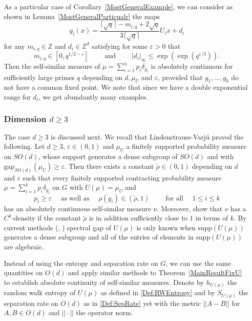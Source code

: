 \documentclass[10pt, english,oneside,reqno]{amsart}
\theoremstyle{plain}
\theoremstyle{remark}
\numberwithin{equation}{section}
\numberwithin{figure}{section}
\newcommand{\eps}{\varepsilon}
\newcommand{\Z}{\mathbb{Z}}
\begin{document}
    As a particular case of Corollary~\ref{MostGeneralExample}, we can consider as shown in Lemma~\ref{MostGeneralParticualr} the maps $$g_i(x) = \frac{\lceil \sqrt{q} \rceil - m_{i,q} + 2\sqrt{q}}{3\lceil \sqrt{q} \rceil}U_ix + d_i$$ for any $m_{i,q} \in \Z$ and $d_i \in \Z^d$ satisfying for some $\eps > 0$ that $$m_{i,q} \in [0,q^{1/2-\eps}] \quad\quad \text{ and } \quad\quad |d_i|_{\infty} \leq \exp(\exp(q^{\eps/3})).$$ Then the self-similar measure of $\mu = \sum_{i = 1}^n p_i\delta_{g_i}$ is absolutely continuous for sufficiently large primes $q$ depending on $d, \mu_U$ and $\eps$, provided that $g_1, \ldots , g_k$ do not have a common fixed point. We note that since we have a double exponential range for $d_i$, we get abundantly many examples. 

    \subsubsection*{\normalfont\textbf{Dimension $d\geq 3$}}

    The case $d\geq 3$ is discussed next. We recall that Lindenstrauss-Varjú \cite{LindenstraussVarju206} proved the following. Let $d\geq 3$, $\eps \in (0,1)$ and $\mu_U$ a finitely supported probability measure on $SO(d)$, whose support generates a dense subgroup of $SO(d)$ and with $\mathrm{gap}_{SO(d)}(\mu_U) \geq \eps$. Then there exists a constant $\widetilde{\rho}  \in (0,1)$ depending on $d$ and $\eps$ such that every finitely supported contracting probability measure $\mu = \sum_{i = 1}^k p_i \delta_{g_i}$ on $G$ with $U(\mu) = \mu_U$ and
    \begin{equation}\label{LindenstraussVarju}
    p_i \geq \eps \quad \text{ as well as } \quad \rho(g_i) \in (\tilde{\rho},1) \quad \quad  \text{ for all } \quad  1 \leq i \leq k
    \end{equation} has an absolutely continuous self-similar measure $\nu$. Moreover, \cite{LindenstraussVarju206} show that $\nu$ has a $C^k$-density if the constant $\widetilde{\rho}$ is in addition sufficiently close to $1$ in terms of $k$. By current methods (\cite{BourgainGamburd2008Invent}, \cite{BenoistDeSaxce2016}) spectral gap of $U(\mu)$ is only known when $\mathrm{supp}(U(\mu))$ generates a dense subgroup and all of the entries of elements in $\mathrm{supp}(U(\mu))$ are algebraic. 

    Instead of using the entropy and separation rate on $G$, we can use the same quantities on $O(d)$ and apply similar methods to Theorem~\ref{MainResultFixU} to establish absolute continuity of self-similar measures. Denote by $h_{U(\mu)}$ the random walk entropy of $U(\mu)$ as defined in \eqref{Def:RWEntropy} and by $S_{U(\mu)}$ the separation rate on $O(d)$ as in \eqref{Def:SepRate} yet with the metric $||A-B||$ for $A,B \in O(d)$ and $||\cdot||$ the operator norm. 
    
\end{document}
